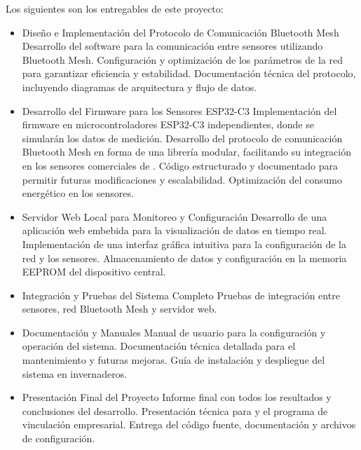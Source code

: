 \documentclass[
11pt, %
]{charter}
\begin{document}
Los siguientes son los entregables de este proyecto: 
\begin{itemize}
	\item Diseño e Implementación del Protocolo de Comunicación Bluetooth Mesh
		\subitem Desarrollo del software para la comunicación entre sensores utilizando Bluetooth Mesh.
		\subitem Configuración y optimización de los parámetros de la red para garantizar eficiencia y estabilidad.
		\subitem Documentación técnica del protocolo, incluyendo diagramas de arquitectura y flujo de datos.

	\item Desarrollo del Firmware para los Sensores ESP32-C3
		\subitem Implementación del firmware en microcontroladores ESP32-C3 independientes, donde se simularán los datos de medición.
		\subitem Desarrollo del protocolo de comunicación Bluetooth Mesh en forma de una librería modular, facilitando su integración en los sensores comerciales de {\empclientename}.
	\subitem Código estructurado y documentado para permitir futuras modificaciones y escalabilidad.
Optimización del consumo energético en los sensores.
	
	\item Servidor Web Local para Monitoreo y Configuración
		\subitem Desarrollo de una aplicación web embebida para la visualización de datos en tiempo real.
		\subitem Implementación de una interfaz gráfica intuitiva para la configuración de la red y los sensores.
		\subitem Almacenamiento de datos y configuración en la memoria EEPROM del dispositivo central.
		

	\item Integración y Pruebas del Sistema Completo
		\subitem Pruebas de integración entre sensores, red Bluetooth Mesh y servidor web.
		
	\item Documentación y Manuales
		\subitem Manual de usuario para la configuración y operación del sistema.
		\subitem Documentación técnica detallada para el mantenimiento y futuras mejoras.
		\subitem Guía de instalación y despliegue del sistema en invernaderos.
		
	\item Presentación Final del Proyecto
		\subitem Informe final con todos los resultados y conclusiones del desarrollo.
		\subitem Presentación técnica para {\empclientename} y el programa de vinculación empresarial.
		\subitem Entrega del código fuente, documentación y archivos de configuración.	
\end{itemize}
\end{document}
